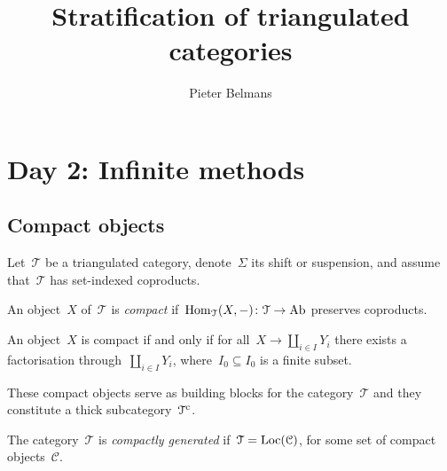 \documentclass[10pt,a4paper]{article}
\title{Stratification of triangulated categories}
\author{Pieter Belmans}
\begin{document}
\maketitle

\section{Day 2: Infinite methods}
\subsection{Compact objects}
Let~$\mathcal{T}$ be a triangulated category, denote~$\Sigma$ its shift or suspension, and assume that~$\mathcal{T}$ has set-indexed coproducts.
\begin{definition}
  An object~$X$ of~$\mathcal{T}$ is \emph{compact} if~$\operatorname{Hom}_{\mathcal{T}}(X,-)\colon\mathcal{T}\to\mathrm{Ab}$ preserves coproducts.
\end{definition}
\begin{lemma}
  An object~$X$ is compact if and only if for all~$X\to\coprod_{i\in I}Y_i$ there exists a factorisation through~$\coprod_{i\in I}Y_i$, where~$I_0\subseteq I_0$ is a finite subset.
\end{lemma}
\begin{remark}
  These compact objects serve as building blocks for the category~$\mathcal{T}$ and they constitute a thick subcategory~$\mathcal{T}^{\mathrm{c}}$.
\end{remark}
\begin{definition}
  The category~$\mathcal{T}$ is \emph{compactly generated} if~$\mathcal{T}=\operatorname{Loc}(\mathcal{C})$, for some set of compact objects~$\mathcal{C}$.
\end{definition}
\end{document}
